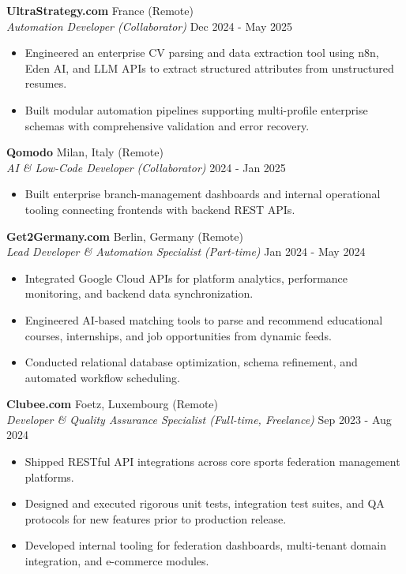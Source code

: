\documentclass[10pt,a4paper]{article}
\begin{document}
\vspace{0.2em}
\textbf{UltraStrategy.com} \hfill France (Remote)\\
\textit{Automation Developer (Collaborator)} \hfill Dec 2024 - May 2025
\begin{itemize}
    \item Engineered an enterprise CV parsing and data extraction tool using n8n, Eden AI, and LLM APIs to extract structured attributes from unstructured resumes.
    \item Built modular automation pipelines supporting multi-profile enterprise schemas with comprehensive validation and error recovery.
\end{itemize}

\vspace{0.2em}
\textbf{Qomodo} \hfill Milan, Italy (Remote)\\
\textit{AI \& Low-Code Developer (Collaborator)} \hfill 2024 - Jan 2025
\begin{itemize}
    \item Built enterprise branch-management dashboards and internal operational tooling connecting frontends with backend REST APIs.
\end{itemize}

\vspace{0.2em}
\textbf{Get2Germany.com} \hfill Berlin, Germany (Remote)\\
\textit{Lead Developer \& Automation Specialist (Part-time)} \hfill Jan 2024 - May 2024
\begin{itemize}
    \item Integrated Google Cloud APIs for platform analytics, performance monitoring, and backend data synchronization.
    \item Engineered AI-based matching tools to parse and recommend educational courses, internships, and job opportunities from dynamic feeds.
    \item Conducted relational database optimization, schema refinement, and automated workflow scheduling.
\end{itemize}

\vspace{0.2em}
\textbf{Clubee.com} \hfill Foetz, Luxembourg (Remote)\\
\textit{Developer \& Quality Assurance Specialist (Full-time, Freelance)} \hfill Sep 2023 - Aug 2024
\begin{itemize}
    \item Shipped RESTful API integrations across core sports federation management platforms.
    \item Designed and executed rigorous unit tests, integration test suites, and QA protocols for new features prior to production release.
    \item Developed internal tooling for federation dashboards, multi-tenant domain integration, and e-commerce modules.
\end{itemize}
\end{document}
